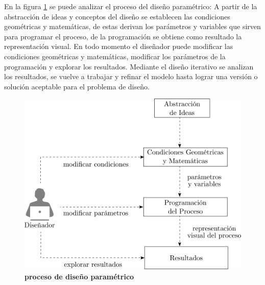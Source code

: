 En la figura \ref{fig:procesopar} se puede analizar el proceso del diseño paramétrico: A partir de la abstracción de ideas y conceptos del diseño se establecen las condiciones geométricas y matemáticas, de estas derivan los parámetros y variables que sirven para programar el proceso, de la programación se obtiene como resultado la representación visual. En todo momento el diseñador puede modificar las condiciones geométricas y matemáticas, modificar los parámetros de la programación y explorar los resultados. Mediante el diseño iterativo se analizan los resultados, se vuelve a trabajar y refinar el modelo hasta lograr una versión o solución aceptable para el problema de diseño. 

\begin{figure}[h]
\includegraphics[width=12cm]{Img/CPD/diseno.png}
\centering
\caption{\textbf{\footnotesize{proceso de diseño paramétrico}}}
\label{fig:procesopar}
\end{figure}

\clearpage
